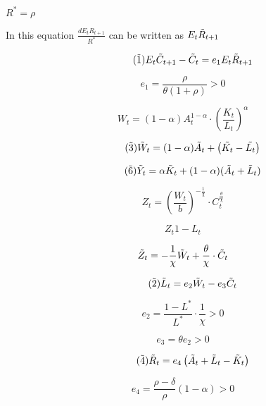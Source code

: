 $R^* = \rho$

In this equation $\frac{d E_t R_{t+1}}{R^*}$ can be written as $E_t \Tilde{R}_{t+1}$

\begin{equation}\tag{$\Tilde{1}$}
    E_t\Tilde{C}_{t+1} - \Tilde{C}_t = e_1 E_t \Tilde{R}_{t + 1}
    \end{equation}
    
    $$
    e_1 = \frac{\rho}{\theta (1 + \rho )} > 0
    $$


\begin{equation}\tag{(3)}
W_t = (1 - \alpha) A_t^{1 - \alpha} \cdot \left( \frac{K_t}{L_t}  \right)^{\alpha} 
\end{equation}

\begin{equation}\tag{$\Tilde{3}$}
\Tilde{W}_t = (1 - \alpha) \Tilde{A}_t + \left( \Tilde{K_t} - \Tilde{L_t}  \right)
\end{equation}

\begin{equation}\tag{$\Tilde{6}$}
    \Tilde{Y}_t = \alpha \Tilde{K}_t + (1 - \alpha)(\Tilde{A}_t + \Tilde{L}_t)
\end{equation}

\begin{equation}
    Z_t = \left( \frac{W_t}{b} \right)^{ - \frac{1}{\chi}} \cdot C_t^{\frac{\theta}{\chi}}
\end{equation}

\begin{equation}
    Z_t 1  - L_t
\end{equation}

\begin{equation}
    \Tilde{Z}_t = - \frac{1}{\chi}\Tilde{W}_t + \frac{\theta}{\chi} \cdot \Tilde{C}_t
\end{equation}

\begin{equation}\tag{$\Tilde{2}$}
    \Tilde{L}_t = e_2 \Tilde{W}_t - e_3 \Tilde{C}_t
\end{equation}

$$
e_2 = \frac{1 - L^*}{L^*} \cdot \frac{1}{\chi} > 0
$$

$$
e_3 = \theta e_2 > 0
$$

\begin{equation}\tag{$\Tilde{4}$}
    \Tilde{R}_t = e_4 \left( \Tilde{A}_t + \Tilde{L}_t - \Tilde{K}_t  \right)
\end{equation}

$$
e_4 = \frac{\rho - \delta}{\rho}(1- \alpha) > 0
$$

